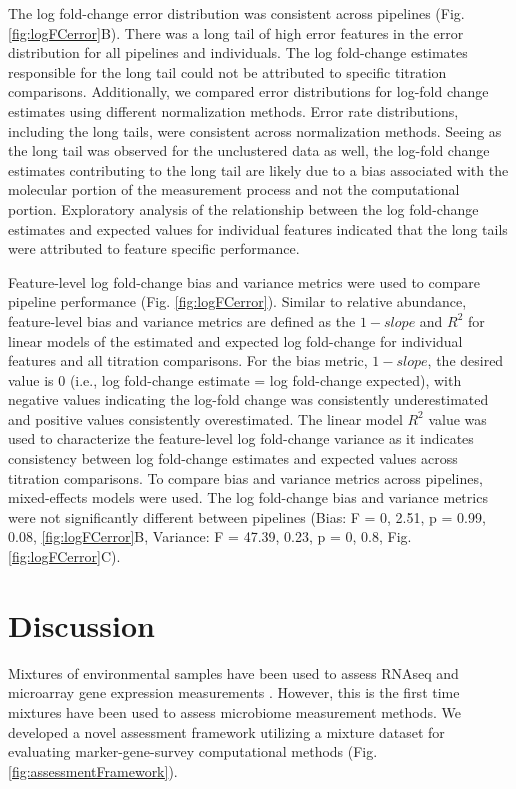 \documentclass[linenumbers]{bmcart}
\begin{document}
The log fold-change error distribution was consistent across pipelines
(Fig. \ref{fig:logFCerror}B). There was a long tail of high error
features in the error distribution for all pipelines and individuals.
The log fold-change estimates responsible for the long tail could not be
attributed to specific titration comparisons. Additionally, we compared
error distributions for log-fold change estimates using
different normalization methods. Error rate distributions, including the
long tails, were consistent across normalization methods. Seeing
as the long tail was observed for the unclustered data as well, the
log-fold change estimates contributing to the long tail are likely due
to a bias associated with the molecular portion of the
measurement process and not the computational portion. Exploratory
analysis of the relationship between the log fold-change estimates and
expected values for individual features indicated that the long tails
were attributed to feature specific performance.

Feature-level log fold-change bias and variance metrics were used to
compare pipeline performance (Fig. \ref{fig:logFCerror}). Similar to
relative abundance, feature-level bias and variance metrics are defined
as the \(1 - slope\) and \(R^2\) for linear models of the estimated and
expected log fold-change for individual features and all titration
comparisons. For the bias metric, \(1 - slope\), the desired value is 0
(i.e., log fold-change estimate = log fold-change expected), with
negative values indicating the log-fold change was consistently
underestimated and positive values consistently overestimated. The
linear model \(R^2\) value was used to characterize the feature-level
log fold-change variance as it indicates consistency between log
fold-change estimates and expected values across titration comparisons.
To compare bias and variance metrics across pipelines, mixed-effects
models were used. The log fold-change bias and variance metrics were not
significantly different between pipelines (Bias: F = 0, 2.51, p = 0.99,
0.08, \ref{fig:logFCerror}B, Variance: F = 47.39, 0.23, p = 0, 0.8, Fig.
\ref{fig:logFCerror}C).


\section*{Discussion}
Mixtures of environmental samples have been used to assess
RNAseq and microarray gene expression measurements \cite{parsons2015using, pine2011adaptable, thompson2005use}.
However, this is the first time mixtures have been used to assess microbiome measurement
methods. We developed a novel assessment framework utilizing a mixture dataset
for evaluating marker-gene-survey computational methods (Fig. \ref{fig:assessmentFramework}).
\end{document}
